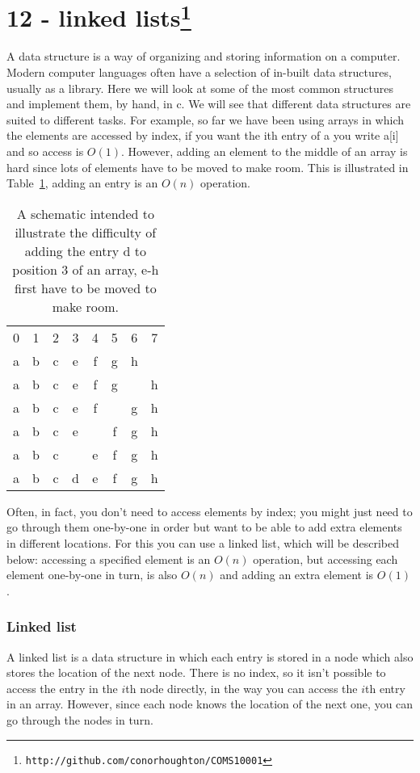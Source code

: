 \documentclass[11pt,a4paper]{scrartcl}
\begin{document}
\section*{12 - linked lists\footnote{\texttt{http://github.com/conorhoughton/COMS10001}}}

A data structure is a way of organizing and storing information on a
computer. Modern computer languages often have a selection of in-built
data structures, usually as a library. Here we will look at some of
the most common structures and implement them, by hand, in c. We will
see that different data structures are suited to different tasks. For
example, so far we have been using arrays in which the elements are
accessed by index, if you want the ith entry of a you write a[i] and
so access is $O(1)$. However, adding an element to the middle of an
array is hard since lots of elements have to be moved to make
room. This is illustrated in Table~\ref{table_reindexing}, adding an
entry is an $O(n)$ operation.

\begin{table}[b]
\begin{tabular}{cccc cccc}
0&1&2&3&4&5&6&7\\
a&b&c&e&f&g&h&\\
a&b&c&e&f&g&&h\\
a&b&c&e&f&&g&h\\
a&b&c&e&&f&g&h\\
a&b&c&&e&f&g&h\\
a&b&c&d&e&f&g&h
\end{tabular}
\caption{A schematic intended to illustrate the difficulty of adding the entry d to position 3 of an array, e-h first have to be moved to make room.\label{table_reindexing}}
\end{table}

Often, in fact, you don't need to access elements by index; you might
just need to go through them one-by-one in order but want to be able
to add extra elements in different locations. For this you can use a
linked list, which will be described below: accessing a specified
element is an $O(n)$ operation, but accessing each element one-by-one
in turn, is also $O(n)$ and adding an extra element is $O(1)$.

\subsubsection*{Linked list}

A linked list is a data structure in which each entry is stored in a
node which also stores the location of the next node. There is no
index, so it isn't possible to access the entry in the $i$th node
directly, in the way you can access the $i$th entry in an
array. However, since each node knows the location of the next one,
you can go through the nodes in turn.
\end{document}
